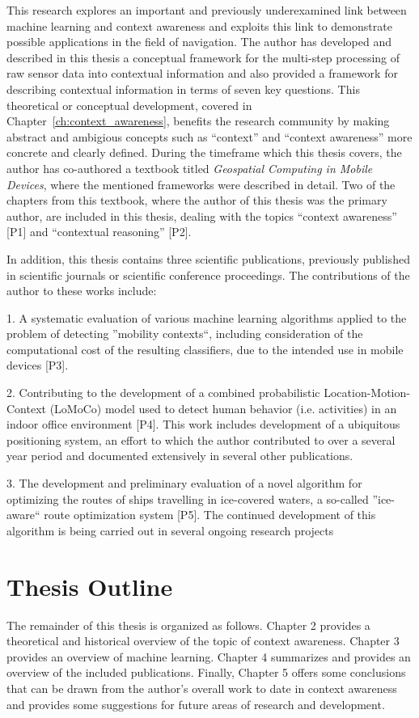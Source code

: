 This research explores an important and previously underexamined link between machine learning and context awareness and exploits this link to demonstrate possible applications in the field of navigation. The author has developed and described in this thesis a conceptual framework for the multi-step processing of raw sensor data into contextual information and also provided a framework for describing contextual information in terms of seven key questions. This theoretical or conceptual development, covered in Chapter~\ref{ch:context_awareness}, benefits the research community by making abstract and ambigious concepts such as ``context'' and ``context awareness'' more concrete and clearly defined. During the timeframe which this thesis covers, the author has co-authored a textbook titled \emph{Geospatial Computing in Mobile Devices}, where the mentioned frameworks were described in detail. Two of the chapters from this textbook, where the author of this thesis was the primary author, are included in this thesis, dealing with the topics ``context awareness'' [P1] and ``contextual reasoning'' [P2].

In addition, this thesis contains three scientific publications, previously published in scientific journals or scientific conference proceedings. The contributions of the author to these works include:

1. A systematic evaluation of various machine learning algorithms applied to the problem of detecting ''mobility contexts``, including consideration of the computational cost of the resulting classifiers, due to the intended use in mobile devices [P3].

2. Contributing to the development of a combined probabilistic Location-Motion-Context (LoMoCo) model used to detect human behavior (i.e. activities) in an indoor office environment [P4]. This work includes development of a ubiquitous positioning system, an effort to which the author contributed to over a several year period and documented extensively in several other publications.

3. The development and preliminary evaluation of a novel algorithm for optimizing the routes of ships travelling in ice-covered waters, a so-called ''ice-aware`` route optimization system [P5]. The continued development of this algorithm is being carried out in several ongoing research projects

\section{Thesis Outline}
\label{sec:outline}
 
The remainder of this thesis is organized as follows. Chapter 2 provides a theoretical and historical overview of the topic of context awareness. Chapter 3 provides an overview of machine learning. Chapter 4 summarizes and provides an overview of the included publications. Finally, Chapter 5 offers some conclusions that can be drawn from the author's overall work to date in context awareness and provides some suggestions for future areas of research and development.